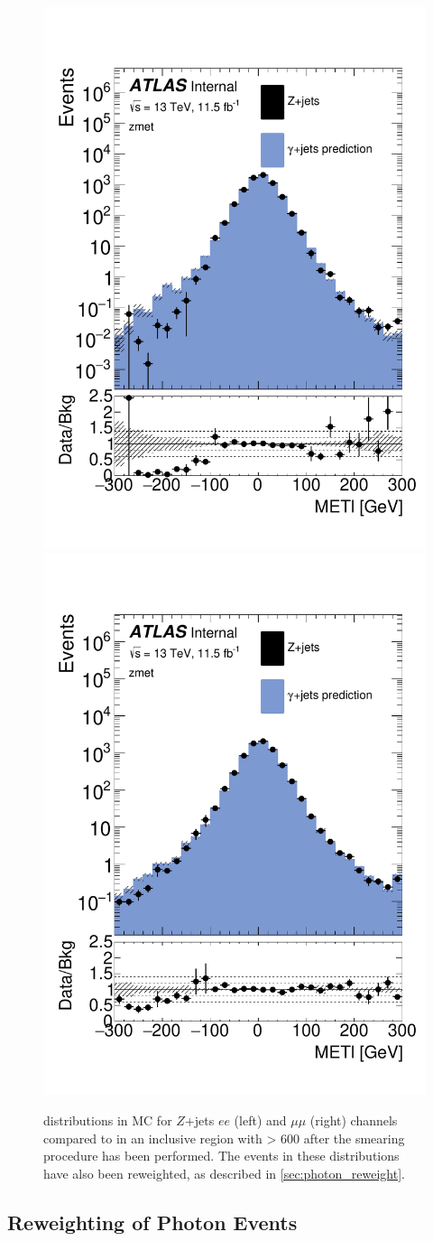 \begin{centering}
\begin{figure}[!hbt]
\myfloatalign
\includegraphics[width=.45\linewidth]{figures/photons/MC_hist_METl_Pt_0_ee_2j_2016_mcmetl_ptsmrw_smear_zmet_.pdf}
\includegraphics[width=.45\linewidth]{figures/photons/MC_hist_METl_Pt_0_mm_2j_2016_mcmetl_ptsmrw_smear_zmet_.pdf}
\caption{\metl distributions in \ac{MC} for $Z$+jets $ee$ (left) and $\mu\mu$ (right) channels compared to  \gjets in an inclusive region with \HT > 600 \gev after the smearing procedure has been performed. The events in these distributions have also been \pt reweighted, as described in \autoref{sec:photon_reweight}.}
\label{fig:photon_metparallelsmeared}
\end{figure}
\end{centering}

\subsection{\pt Reweighting of Photon Events}
\label{sec:photon_reweight}

